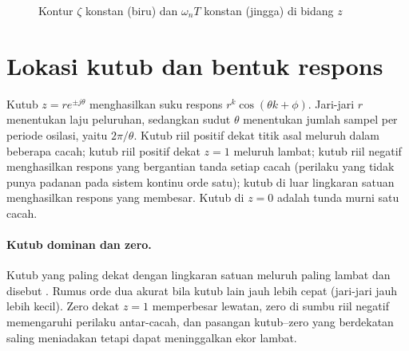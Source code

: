 \begin{figure}[H]
	\centering
	\caption{Kontur $\zeta$ konstan (biru) dan $\omega_nT$ konstan (jingga) di bidang $z$}
	\label{fig:b6-kontur}
\end{figure}

\section{Lokasi kutub dan bentuk respons}
Kutub $z = re^{\pm j\theta}$ menghasilkan suku respons $r^k\cos(\theta k + \phi)$. Jari-jari $r$ menentukan laju peluruhan, sedangkan sudut $\theta$ menentukan jumlah sampel per periode osilasi, yaitu $2\pi/\theta$. Kutub riil positif dekat titik asal meluruh dalam beberapa cacah; kutub riil positif dekat $z = 1$ meluruh lambat; kutub riil negatif menghasilkan respons yang bergantian tanda setiap cacah (perilaku yang tidak punya padanan pada sistem kontinu orde satu); kutub di luar lingkaran satuan menghasilkan respons yang membesar. Kutub di $z = 0$ adalah tunda murni satu cacah.

\paragraph{Kutub dominan dan zero.} Kutub yang paling dekat dengan lingkaran satuan meluruh paling lambat dan disebut . Rumus orde dua akurat bila kutub lain jauh lebih cepat (jari-jari jauh lebih kecil). Zero dekat $z = 1$ memperbesar lewatan, zero di sumbu riil negatif memengaruhi perilaku antar-cacah, dan pasangan kutub--zero yang berdekatan saling meniadakan tetapi dapat meninggalkan ekor lambat.

